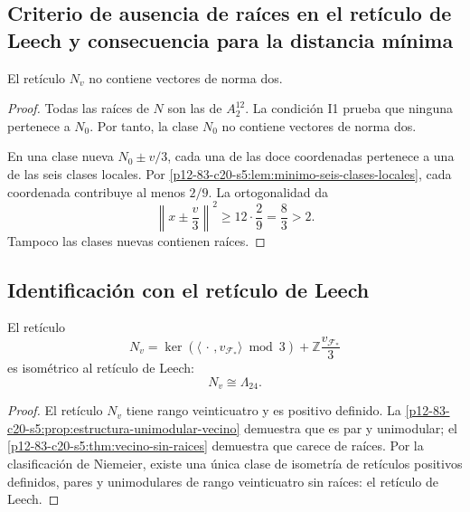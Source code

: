 \subsection{Criterio de ausencia de raíces en el retículo de Leech y consecuencia para la distancia mínima}

\begin{theorem}
\label{p12-83-c20-s5:thm:vecino-sin-raices}
El retículo \(N_v\) no contiene vectores de norma dos.
\end{theorem}

\begin{proof}
Todas las raíces de \(N\) son las de \(A_2^{12}\). La condición I1 prueba
que ninguna pertenece a \(N_0\). Por tanto, la clase \(N_0\) no contiene
vectores de norma dos.

En una clase nueva \(N_0\pm v/3\), cada una de las doce coordenadas
pertenece a una de las seis clases locales. Por
\cref{p12-83-c20-s5:lem:minimo-seis-clases-locales}, cada coordenada contribuye al menos
\(2/9\). La ortogonalidad da
\[
 \left\|x\pm\frac v3\right\|^2
 \geq12\cdot\frac29=\frac83>2.
\]
Tampoco las clases nuevas contienen raíces.
\end{proof}

\subsection{Identificación con el retículo de Leech}

\begin{theorem}
\label{p12-83-c20-s5:thm:identificacion-vecino-leech}
El retículo
\begin{equation}
 N_v
 =\ker(\langle\,\cdot\,,v_{\mathcal F_*}\rangle\bmod3)
  +\mathbb Z\frac{v_{\mathcal F_*}}3
 \label{p12-83-c20-s5:eq:formula-final-vecino-leech}
\end{equation}
es isométrico al retículo de Leech:
\begin{equation}
 \boxed{N_v\cong\Lambda_{24}.}
 \label{p12-83-c20-s5:eq:identificacion-leech-autonoma}
\end{equation}
\end{theorem}

\begin{proof}
El retículo \(N_v\) tiene rango veinticuatro y es positivo definido. La
\cref{p12-83-c20-s5:prop:estructura-unimodular-vecino} demuestra que es par y unimodular;
el \cref{p12-83-c20-s5:thm:vecino-sin-raices} demuestra que carece de raíces. Por la
clasificación de Niemeier, existe una única clase de isometría de retículos
positivos definidos, pares y unimodulares de rango veinticuatro sin raíces:
el retículo de Leech.
\end{proof}

